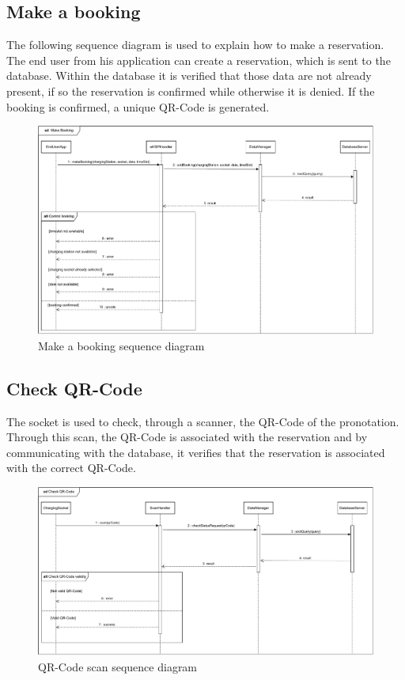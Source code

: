 \subsection{Make a booking}
The following sequence diagram is used to explain how to make a reservation. The end user from his application can create a reservation, which is sent to the database. Within the database it is verified that those data are not already present, if so the reservation is confirmed while otherwise it is denied. If the booking is confirmed, a unique QR-Code is generated.
\begin{figure}[H]
    \centering
    \includegraphics[width=\textwidth]{images/sd_bookingRequest.pdf}
    \caption{Make a booking sequence diagram}
    \label{fig:makeBooking}
\end{figure}
\subsection{Check QR-Code}
The socket is used to check, through a scanner, the QR-Code of the pronotation. Through this scan, the QR-Code is associated with the reservation and by communicating with the database, it verifies that the reservation is associated with the correct QR-Code.
\begin{figure}[H]
    \centering
    \includegraphics[width=\textwidth]{images/sd_qrCodeScan.pdf}
    \caption{QR-Code scan sequence diagram}
    \label{fig:qrCodeScan}
\end{figure}
